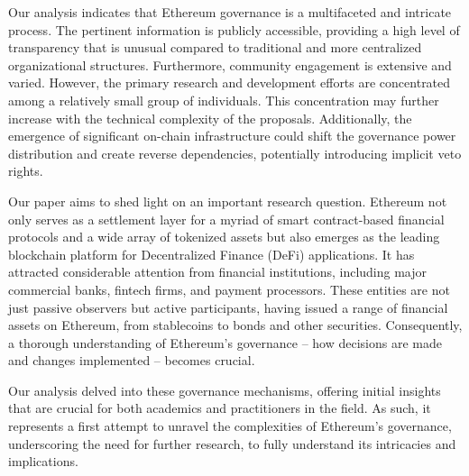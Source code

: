 \documentclass[No]{AEA}
\begin{document}
Our analysis indicates that Ethereum governance is a multifaceted and intricate process. The pertinent information is publicly accessible, providing a high level of transparency that is unusual compared to traditional and more centralized organizational structures. Furthermore, community engagement is extensive and varied. However, the primary research and development efforts are concentrated among a relatively small group of individuals. This concentration may further increase with the technical complexity of the proposals. Additionally, the emergence of significant on-chain infrastructure could shift the governance power distribution and create reverse dependencies, potentially introducing implicit veto rights.

Our paper aims to shed light on an important research question. Ethereum not only serves as a settlement layer for a myriad of smart contract-based financial protocols and a wide array of tokenized assets but also emerges as the leading blockchain platform for Decentralized Finance (DeFi) applications. 
It has attracted considerable attention from financial institutions, including major commercial banks, fintech firms, and payment processors. These entities are not just passive observers but active participants, having issued a range of financial assets on Ethereum, from stablecoins to bonds and other securities. Consequently, a thorough understanding of Ethereum's governance -- how decisions are made and changes implemented -- becomes crucial. 

Our analysis delved into these governance mechanisms, offering initial insights that are crucial for both academics and practitioners in the field. As such, it represents a first attempt to unravel the complexities of Ethereum's governance, underscoring the need for further research, to fully understand its intricacies and implications.


\newpage


\end{document}
